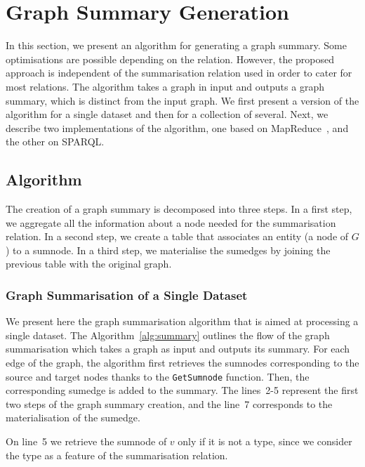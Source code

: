 \section{Graph Summary Generation}
\label{chap:summary:algo}

In this section, we present an algorithm for generating a graph summary. Some optimisations are possible depending on the relation. However, the proposed approach is independent of the summarisation relation used in order to cater for most relations. The algorithm takes a graph in input and outputs a graph summary, which is distinct from the input graph.
We first present a version of the algorithm for a single dataset and then for a collection of several.
Next, we describe two implementations of the algorithm, one based on MapReduce~\cite{dean:2004:msd}, and the other on SPARQL.

\subsection{Algorithm}

The creation of a graph summary is decomposed into three steps. In a first step, we aggregate all the information about a node needed for the summarisation relation. In a second step, we create a table that associates an entity (a node of $G$) to a sumnode. In a third step, we materialise the sumedges by joining the previous table with the original graph.

\subsubsection{Graph Summarisation of a Single Dataset}

We present here the graph summarisation algorithm that is aimed at processing a single dataset.
The Algorithm~\ref{alg:summary} outlines the flow of the graph summarisation which takes a graph as input and outputs its summary. For each edge of the graph, the algorithm first retrieves the sumnodes corresponding to the source and target nodes thanks to the \texttt{GetSumnode} function. Then, the corresponding sumedge is added to the summary. The lines~2-5 represent the first two steps of the graph summary creation, and the line~7 corresponds to the materialisation of the sumedge.

\begin{remark}
On line~5 we retrieve the sumnode of $v$ only if it is not a type, since we consider the type as a feature of the summarisation relation.
\end{remark}

